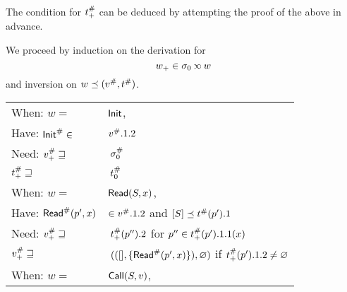 The condition for ${t}^{\#}_+$ can be deduced by attempting the proof of the above in advance.

We proceed by induction on the derivation for
\[w_+\in\ctx_0\semlink w\]
and inversion on $w\preceq({v}^{\#},{t}^{\#})$.
\begin{center}
  \begin{tabular}{|l@{\hskip2pt}l|}
    \hline
    When: \hfill $w=$                                & $\textsf{Init}$,                                                                                                                                               \\
    Have: \hfill ${\textsf{Init}}^{\#}\in$                     & ${v}^{\#}.1.2$                                                                                                                                           \\
    Need: \hfill ${v}^{\#}_+\sqsupseteq$              & $\:{\sigma}^{\#}_0$                                                                                                                                          \\
          \hfill ${t}^{\#}_+\sqsupseteq$           & $\:{t}^{\#}_0$                                                                                                                                        \\
    \hline
    When: \hfill $w=$                                & $\textsf{Read}(S,x)$,                                                                                                                                     \\
    Have: \hfill ${\textsf{Read}}^{\#}(p',x)$                  & $\in{v}^{\#}.1.2$ and $[S]\preceq{t}^{\#}(p').1$                                                                                                  \\
    Need: \hfill ${v}^{\#}_+\sqsupseteq$              & $\:{t}^{\#}_+(p'').2$                                                             \hfill for $p''\in{t}^{\#}_+(p').1.1(x)$                          \\
          \hfill ${v}^{\#}_+\sqsupseteq$              & $\:(([],\{{\textsf{Read}}^{\#}(p',x)\}),\varnothing)$                                         \hfill if ${t}^{\#}_+(p').1.2\neq\varnothing$                     \\
    \hline
    When: \hfill $w=$                                & $\textsf{Call}(S,v)$,                                                                                                                                     \\

\end{tabular}
\end{center}
